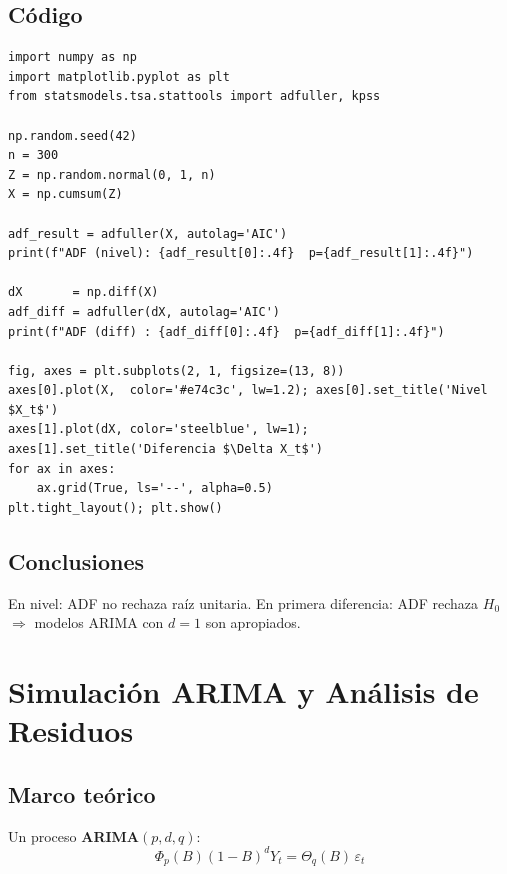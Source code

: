 \documentclass[12pt,letterpaper]{article}
\begin{document}
\subsection{C\'odigo}

\begin{lstlisting}[style=python, caption={Caminata aleatoria y pruebas ADF/KPSS}]
import numpy as np
import matplotlib.pyplot as plt
from statsmodels.tsa.stattools import adfuller, kpss

np.random.seed(42)
n = 300
Z = np.random.normal(0, 1, n)
X = np.cumsum(Z)

adf_result = adfuller(X, autolag='AIC')
print(f"ADF (nivel): {adf_result[0]:.4f}  p={adf_result[1]:.4f}")

dX       = np.diff(X)
adf_diff = adfuller(dX, autolag='AIC')
print(f"ADF (diff) : {adf_diff[0]:.4f}  p={adf_diff[1]:.4f}")

fig, axes = plt.subplots(2, 1, figsize=(13, 8))
axes[0].plot(X,  color='#e74c3c', lw=1.2); axes[0].set_title('Nivel $X_t$')
axes[1].plot(dX, color='steelblue', lw=1);  axes[1].set_title('Diferencia $\Delta X_t$')
for ax in axes:
    ax.grid(True, ls='--', alpha=0.5)
plt.tight_layout(); plt.show()
\end{lstlisting}

\subsection{Conclusiones}

En nivel: ADF no rechaza ra\'iz unitaria. En primera diferencia: ADF rechaza
$H_0$ $\Rightarrow$ modelos ARIMA con $d=1$ son apropiados.

\section{Simulaci\'on ARIMA y An\'alisis de Residuos}

\subsection{Marco te\'orico}

Un proceso \textbf{ARIMA$(p,d,q)$}:
\begin{equation}
  \Phi_p(B)(1-B)^d Y_t = \Theta_q(B)\,\varepsilon_t
\end{equation}
\end{document}
